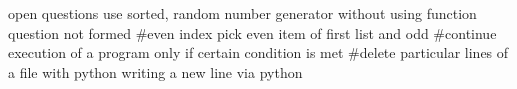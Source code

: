 open questions
use sorted, random number generator without using function
question not formed #even index pick even item of first list and odd 
#continue execution of a program only if certain condition is met
#delete particular lines of a file with python
writing a new line via python